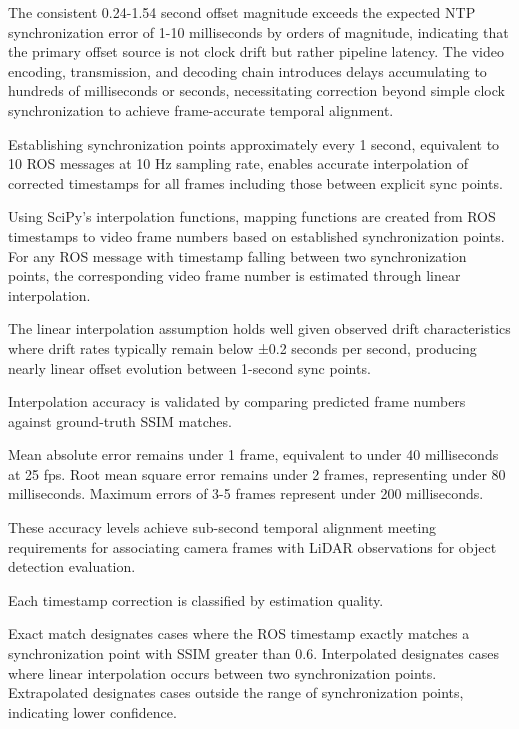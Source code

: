 \documentclass{erauthesis}
\begin{document}

The consistent 0.24-1.54 second offset magnitude exceeds the expected NTP synchronization error of 1-10 milliseconds by orders of magnitude, indicating that the primary offset source is not clock drift but rather pipeline latency.
The video encoding, transmission, and decoding chain introduces delays accumulating to hundreds of milliseconds or seconds, necessitating correction beyond simple clock synchronization to achieve frame-accurate temporal alignment.


Establishing synchronization points approximately every 1 second, equivalent to 10 ROS messages at 10 Hz sampling rate, enables accurate interpolation of corrected timestamps for all frames including those between explicit sync points.


Using SciPy's interpolation functions, mapping functions are created from ROS timestamps to video frame numbers based on established synchronization points.
For any ROS message with timestamp falling between two synchronization points, the corresponding video frame number is estimated through linear interpolation.

The linear interpolation assumption holds well given observed drift characteristics where drift rates typically remain below ±0.2 seconds per second, producing nearly linear offset evolution between 1-second sync points.


Interpolation accuracy is validated by comparing predicted frame numbers against ground-truth SSIM matches.

Mean absolute error remains under 1 frame, equivalent to under 40 milliseconds at 25 fps.
Root mean square error remains under 2 frames, representing under 80 milliseconds.
Maximum errors of 3-5 frames represent under 200 milliseconds.

These accuracy levels achieve sub-second temporal alignment meeting requirements for associating camera frames with LiDAR observations for object detection evaluation.


Each timestamp correction is classified by estimation quality.

Exact match designates cases where the ROS timestamp exactly matches a synchronization point with SSIM greater than 0.6.
Interpolated designates cases where linear interpolation occurs between two synchronization points.
Extrapolated designates cases outside the range of synchronization points, indicating lower confidence.
\end{document}
